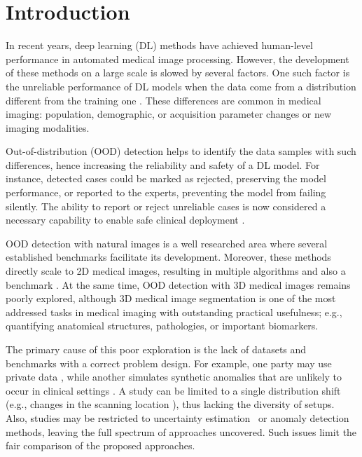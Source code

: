 \section{Introduction}

In recent years, deep learning (DL) methods have achieved human-level performance in automated medical image processing. However, the development of these methods on a large scale is slowed by several factors. One such factor is the unreliable performance of DL models when the data come from a distribution different from the training one \cite{wang2018deep}. These differences are common in medical imaging: population, demographic, or acquisition parameter changes or new imaging modalities.

Out-of-distribution (OOD) detection helps to identify the data samples with such differences, hence increasing the reliability and safety of a DL model. For instance, detected cases could be marked as rejected, preserving the model performance, or reported to the experts, preventing the model from failing silently. The ability to report or reject unreliable cases is now considered a necessary capability to enable safe clinical deployment \cite{kompa2021second}.

OOD detection with natural images is a well researched area \cite{yang2024generalized} where several established benchmarks \cite{hendrycks2016baseline,basart2022scaling} facilitate its development. Moreover, these methods directly scale to 2D medical images, resulting in multiple algorithms \cite{mahmood2020multiscale,pacheco2020out,berger2021confidence} and also a benchmark \cite{cao2020benchmark}. At the same time, OOD detection with 3D medical images remains poorly explored, although 3D medical image segmentation is one of the most addressed tasks in medical imaging \cite{litjens2017survey} with outstanding practical usefulness; e.g., quantifying anatomical structures, pathologies, or important biomarkers.

The primary cause of this poor exploration is the lack of datasets and benchmarks with a correct problem design. For example, one party may use private data \cite{karimi2022improving}, while another simulates synthetic anomalies that are unlikely to occur in clinical settings \cite{david_zimmerer_2022_6362313}. A study can be limited to a single distribution shift (e.g., changes in the scanning location \cite{karimi2022improving}), thus lacking the diversity of setups. Also, studies may be restricted to uncertainty estimation~\cite{lambert2022improving} or anomaly detection \cite{david_zimmerer_2022_6362313} methods, leaving the full spectrum of approaches uncovered. Such issues limit the fair comparison of the proposed approaches.

